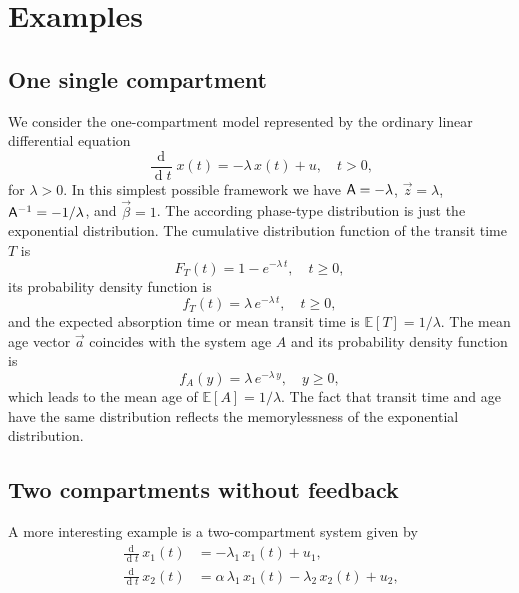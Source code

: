 \documentclass[smallextended]{svjour3}
\newcommand{\E}{\mathbb{E}}
\newcommand{\deriv}[1]{\frac{\operatorname{d}}{\operatorname{d}#1}}
\begin{document}
\section{Examples}\label{appendix:examples}

\subsection{One single compartment}

We consider the one-compartment model represented by the ordinary linear differential equation
\[
    \deriv{t} x(t) = -\lambda\,x(t) + u,\quad t>0,
\]
for $\lambda>0$.
In this simplest possible framework we have $\mathsf{A} = -\lambda$, $\vec{z} = \lambda$, $\mathsf{A}^{-1}=-1/\lambda$, and $\vec{\beta}=1$.
The according phase-type distribution is just the exponential distribution.
The cumulative distribution function of the transit time $T$ is
\[
    F_T(t) = 1-e^{-\lambda\,t},\quad t\geq0,
\]
its probability density function is
\[
    f_T(t) = \lambda\,e^{-\lambda\,t}, \quad t\geq0,
\]
and the expected absorption time or mean transit time is $\E[T]=1/\lambda$.
The mean age vector $\vec{a}$ coincides with the system age $A$ and its probability density function is
\[
    f_A(y) = \lambda\,e^{-\lambda\,y},\quad y\geq0,
\]
which leads to the mean age of $\E[A]=1/\lambda$.
The fact that transit time and age have the same distribution reflects the memorylessness of the exponential distribution.

\subsection{Two compartments without feedback}
A more interesting example is a two-compartment system given by
\begin{equation*}\label{eqn:twocompartment}
\begin{aligned}
    \deriv{t}x_1(t) &= -\lambda_1\,x_1(t) + u_1,\\
    \deriv{t}x_2(t) &= \alpha\,\lambda_1\,x_1(t) - \lambda_2\,x_2(t) + u_2,
\end{aligned}
\end{equation*}
\end{document}
